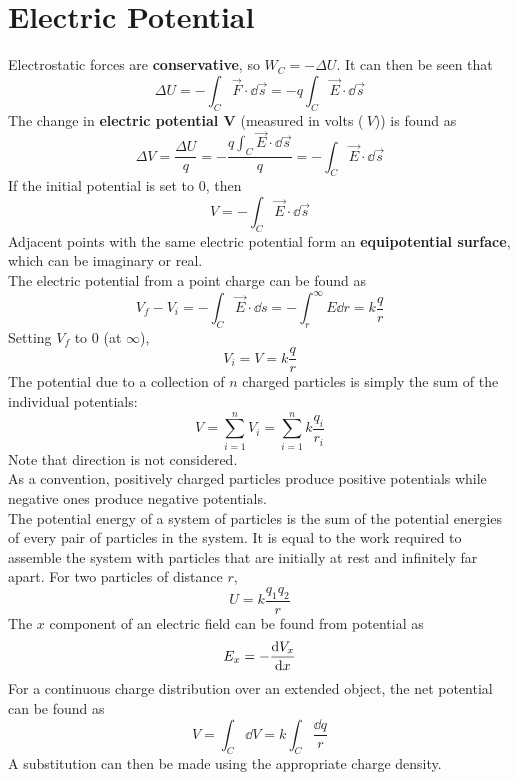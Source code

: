 \documentclass[./Electricity and Magnetism.tex]{subfiles}
\begin{document}
	\section{Electric Potential}
		Electrostatic forces are \textbf{conservative}, so \(W_C = -\Delta U\). It can then be seen that
			\[
				\Delta U = - \int_C \vec{F} \cdot \dd{\vec{s}} 
						= -q\int_C \vec{E} \cdot \dd{\vec{s}}
			\]	
		The change in \textbf{electric potential \(\bm{V}\)} (measured in volts (\(\SI{}{V}\))) is found as
			\[
				\Delta V = \frac{\Delta U}{q}
					= -\frac{q\int_C \vec{E} \cdot \dd{\vec{s}}}{q}
					= -\int_C \vec{E} \cdot \dd{\vec{s}}
			\]
			If the initial potential is set to 0, then
			\[V = -\int_C \vec{E} \cdot \dd{\vec{s}}\]
		Adjacent points with the same electric potential form an \textbf{equipotential surface}, which can be imaginary or real. \\
		The electric potential from a point charge can be found as
			\[
				V_f - V_i = -\int_C \vec{E} \cdot \dd{s}
					= -\int_r^\infty E \dd{r}
					= k\frac{q}{r}
			\]
			Setting \(V_f\) to 0 (at \(\infty\)),
			\[V_i = V = k\frac{q}{r}\]
		The potential due to a collection of \(n\) charged particles is simply the sum of the individual potentials:
			\[V = \sum_{i = 1}^n V_i = \sum_{i = 1}^n k\frac{q_i}{r_i} \tag{\(n\) charged particles}\]
			Note that direction is not considered. \\
			As a convention, positively charged particles produce positive potentials while negative ones produce negative potentials. \\
		The potential energy of a system of particles is the sum of the potential energies of every pair of particles in the system. It is equal to the work required to assemble the system with particles that are initially at rest and infinitely far apart. For two particles of distance \(r\),
			\[U = k\frac{q_1q_2}{r} \tag{2-particle system}\]
		The \(x\) component of an electric field can be found from potential as
			\[E_x = -\dv{V_x}{x}\]
		For a continuous charge distribution over an extended object, the net potential can be found as
			\[V = \int_C \dd{V} = k\int_C \frac{\dd{q}}{r}\]
			A substitution can then be made using the appropriate charge density.
\end{document}
